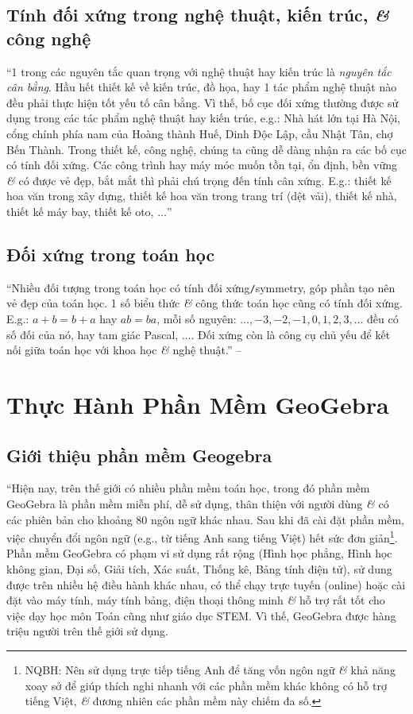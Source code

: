 \documentclass[oneside]{book}
\numberwithin{equation}{section}
\begin{document}
\subsection{Tính đối xứng trong nghệ thuật, kiến trúc, \textit{\&} công nghệ}
``1 trong các nguyên tắc quan trọng với nghệ thuật hay kiến trúc là \textit{nguyên tắc cân bằng}. Hầu hết thiết kế về kiến trúc, đồ họa, hay 1 tác phẩm nghệ thuật nào đều phải thực hiện tốt yếu tố cân bằng. Vì thế, bố cục đối xứng thường được sử dụng trong các tác phẩm nghệ thuật hay kiến trúc, e.g.: Nhà hát lớn tại Hà Nội, cổng chính phía nam của Hoàng thành Huế, Dinh Độc Lập, cầu Nhật Tân, chợ Bến Thành. Trong thiết kế, công nghệ, chúng ta cũng dễ dàng nhận ra các bố cục có tính đối xứng. Các công trình hay máy móc muốn tồn tại, ổn định, bền vững \textit{\&} có được vẻ đẹp, bắt mắt thì phải chú trọng đến tính cân xứng. E.g.: thiết kế hoa văn trong xây dựng, thiết kế hoa văn trong trang trí (dệt vải), thiết kế nhà, thiết kế máy bay, thiết kế oto, $\ldots$'' \cite[pp. 114--115]{Thai_Anh_Dat_Ha_Loan_Nam_Quang_Toan_6_tap_1}

\subsection{Đối xứng trong toán học}
``Nhiều đối tượng trong toán học có tính đối xứng\texttt{/}symmetry, góp phần tạo nên vẻ đẹp của toán học. 1 số biểu thức \textit{\&} công thức toán học cũng có tính đối xứng. E.g.: $a + b = b + a$ hay $ab = ba$, mỗi số nguyên: $\ldots,-3,-2,-1,0,1,2,3,\ldots$ đều có số đối của nó, hay tam giác Pascal, $\ldots$. Đối xứng còn là công cụ chủ yếu để kết nối giữa toán học với khoa học \textit{\&} nghệ thuật.'' -- \cite[p. 115]{Thai_Anh_Dat_Ha_Loan_Nam_Quang_Toan_6_tap_1}

\section{Thực Hành Phần Mềm GeoGebra}

\subsection{Giới thiệu phần mềm Geogebra}
``Hiện nay, trên thế giới có nhiều phần mềm toán học, trong đó phần mềm GeoGebra là phần mềm miễn phí, dễ sử dụng, thân thiện với người dùng \textit{\&} có các phiên bản cho khoảng 80 ngôn ngữ khác nhau. Sau khi đã cài đặt phần mềm, việc chuyển đổi ngôn ngữ (e.g., từ tiếng Anh sang tiếng Việt) hết sức đơn giản\footnote{NQBH: Nên sử dụng trực tiếp tiếng Anh để tăng vốn ngôn ngữ \textit{\&} khả năng xoay sở để giúp thích nghi nhanh với các phần mềm khác không có hỗ trợ tiếng Việt, \textit{\&} đương nhiên các phần mềm này chiếm đa số.}. Phần mềm GeoGebra có phạm vi sử dụng rất rộng (Hình học phẳng, Hình học không gian, Đại số, Giải tích, Xác suất, Thống kê, Bảng tính điện tử), sử dung được trên nhiều hệ điều hành khác nhau, có thể chạy trực tuyến (online) hoặc cài đặt vào máy tính, máy tính bảng, điện thoại thông minh \textit{\&} hỗ trợ rất tốt cho việc dạy học môn Toán cũng như giáo dục STEM. Vì thế, GeoGebra được hàng triệu người trên thế giới sử dụng.
\end{document}
